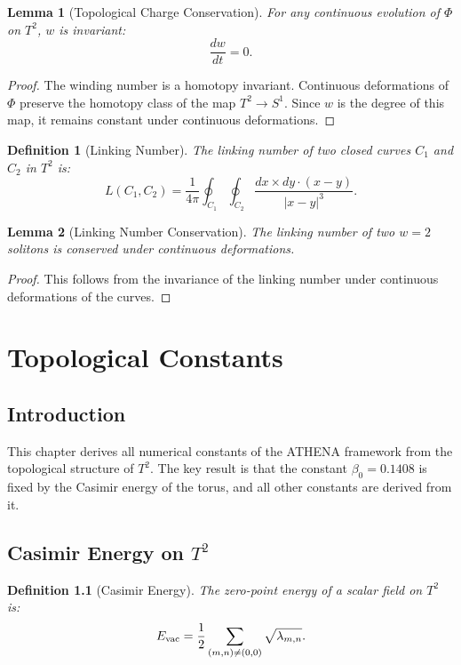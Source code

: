 \documentclass[12pt,oneside]{book}
\newtheorem{definition}{Definition}[chapter]
\newtheorem{lemma}{Lemma}[chapter]
\begin{document}
\begin{lemma}[Topological Charge Conservation]
For any continuous evolution of $\Phi$ on $T^2$, $w$ is invariant:
\[
\frac{dw}{dt} = 0.
\]
\end{lemma}

\begin{proof}
The winding number is a homotopy invariant. Continuous deformations of $\Phi$ preserve the homotopy class of the map $T^2 \to S^1$. Since $w$ is the degree of this map, it remains constant under continuous deformations.
\end{proof}

\begin{definition}[Linking Number]
The linking number of two closed curves $C_1$ and $C_2$ in $T^2$ is:
\[
L(C_1, C_2) = \frac{1}{4\pi}\oint_{C_1}\oint_{C_2} \frac{dx \times dy \cdot (x - y)}{|x - y|^3}.
\]
\end{definition}

\begin{lemma}[Linking Number Conservation]
The linking number of two $w = 2$ solitons is conserved under continuous deformations.
\end{lemma}

\begin{proof}
This follows from the invariance of the linking number under continuous deformations of the curves.
\end{proof}

\chapter{Topological Constants}

\section{Introduction}

This chapter derives all numerical constants of the ATHENA framework from the topological structure of $T^2$. The key result is that the constant $\beta_0 = 0.1408$ is fixed by the Casimir energy of the torus, and all other constants are derived from it.

\section{Casimir Energy on $T^2$}

\begin{definition}[Casimir Energy]
The zero-point energy of a scalar field on $T^2$ is:
\[
E_{\rm vac} = \frac{1}{2}\sum_{(m,n)\neq(0,0)} \sqrt{\lambda_{m,n}}.
\]
\end{definition}
\end{document}
